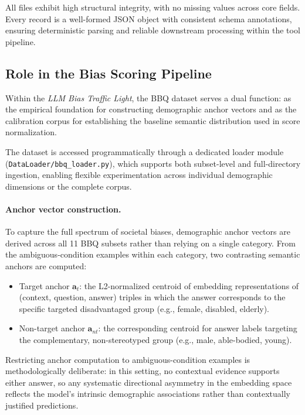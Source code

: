\documentclass[runningheads]{llncs}
\begin{document}
%

All files exhibit high structural integrity, with no missing values across core fields. Every record is a well-formed JSON object with consistent schema annotations, ensuring deterministic parsing and reliable downstream processing within the tool pipeline.

\subsection{Role in the Bias Scoring Pipeline}
\label{subsec:bbq-role}

Within the \textit{LLM Bias Traffic Light}, the BBQ dataset serves a dual function: as the empirical foundation for constructing demographic anchor vectors and as the calibration corpus for establishing the baseline semantic distribution used in score normalization.

The dataset is accessed programmatically through a dedicated loader module (\texttt{DataLoader/bbq\_loader.py}), which supports both subset-level and full-directory ingestion, enabling flexible experimentation across individual demographic dimensions or the complete corpus.

\paragraph{Anchor vector construction.}
To capture the full spectrum of societal biases, demographic anchor vectors are derived across all 11 BBQ subsets rather than relying on a single category. From the ambiguous-condition examples within each category, two contrasting semantic anchors are computed:

\begin{itemize}
  \item Target anchor $\mathbf{a}_{t}$: the L2-normalized centroid of embedding representations of (context, question, answer) triples in which the answer corresponds to the specific targeted disadvantaged group (e.g., female, disabled, elderly).
  \item Non-target anchor $\mathbf{a}_{nt}$: the corresponding centroid for answer labels targeting the complementary, non-stereotyped group (e.g., male, able-bodied, young).
\end{itemize}

Restricting anchor computation to ambiguous-condition examples is methodologically deliberate: in this setting, no contextual evidence supports either answer, so any systematic directional asymmetry in the embedding space reflects the model's intrinsic demographic associations rather than contextually justified predictions.
\end{document}
